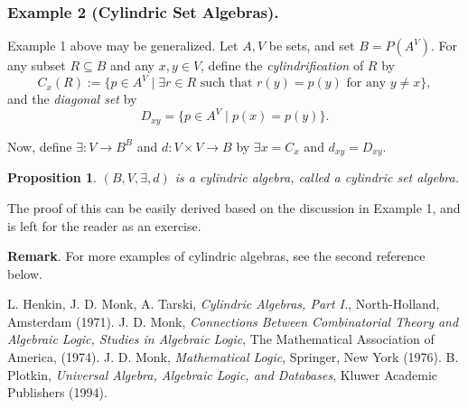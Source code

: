 \documentclass[12pt]{article}
\newtheorem{prop}{Proposition}
\begin{document}
\subsubsection*{Example 2 (Cylindric Set Algebras).}

Example 1 above may be generalized.  Let $A,V$ be sets, and set $B=P(A^V)$.  For any subset $R\subseteq B$ and any $x,y \in V$, define the \emph{cylindrification} of $R$ by $$C_x(R):=\lbrace p\in A^V\mid \exists r \in R \mbox{ such that } r(y)=p(y) \mbox{ for any }y\ne x\rbrace, $$ and the \emph{diagonal set} by $$D_{xy}=\lbrace p\in A^V\mid p(x)=p(y)\rbrace.$$

Now, define $\exists: V\to B^B$ and $d:V\times V\to B$ by $\exists x=C_x$ and $d_{xy}=D_{xy}$.

\begin{prop} $(B,V,\exists,d)$ is a cylindric algebra, called a \emph{cylindric set algebra}. \end{prop}

The proof of this can be easily derived based on the discussion in Example 1, and is left for the reader as an exercise.

\textbf{Remark}.  For more examples of cylindric algebras, see the second reference below.

\begin{thebibliography}{8}
 L. Henkin, J. D. Monk, A. Tarski, \emph{Cylindric Algebras, Part I.}, North-Holland, Amsterdam (1971).
 J. D. Monk, {\em Connections Between Combinatorial Theory and Algebraic Logic, Studies in Algebraic Logic}, The Mathematical Association of America, (1974).
 J. D. Monk, \emph{Mathematical Logic}, Springer, New York (1976).
 B. Plotkin, \emph{Universal Algebra, Algebraic Logic, and Databases}, Kluwer Academic Publishers (1994).
\end{thebibliography}
\end{document}
